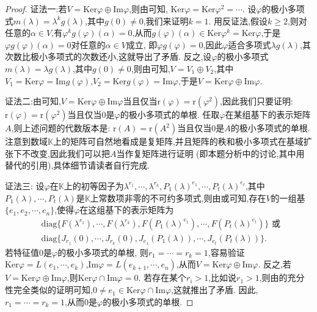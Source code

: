 \documentclass[../../main.tex]{subfiles}%
\begin{document}
\begin{proof}

{\color{blue}证法一:}若$V=\mathrm{Ker}\varphi\oplus\mathrm{Im}\varphi$,则由可知, $\mathrm{Ker}\varphi=\mathrm{Ker}\varphi^2=\cdots$. 设$\varphi$的极小多项式$m(\lambda)=\lambda^kg(\lambda)$,其中$g(0)\neq 0$,我们来证明$k = 1$. 用反证法,假设$k\geqslant 2$,则对任意的$\alpha\in V$,有$\varphi^kg(\varphi)(\alpha)=0$,从而$g(\varphi)(\alpha)\in\mathrm{Ker}\varphi^k=\mathrm{Ker}\varphi$,于是$\varphi g(\varphi)(\alpha)=0$对任意的$\alpha\in V$成立, 即$\varphi g(\varphi)=0$,因此$\varphi$适合多项式$\lambda g(\lambda)$,其次数比极小多项式的次数还小,这就导出了矛盾. 反之,设$\varphi$的极小多项式$m(\lambda)=\lambda g(\lambda)$,其中$g(0)\neq 0$,则由可知,$V = V_1\oplus V_2$,其中$V_1=\mathrm{Ker}\varphi=\mathrm{Im}g(\varphi)$,$V_2=\mathrm{Ker}g(\varphi)=\mathrm{Im}\varphi$,于是$V=\mathrm{Ker}\varphi\oplus\mathrm{Im}\varphi$.

{\color{blue}证法二:}由可知,$V=\mathrm{Ker}\varphi\oplus\mathrm{Im}\varphi$当且仅当$\mathrm{r}(\varphi)=\mathrm{r}(\varphi^2)$,因此我们只要证明: $\mathrm{r}(\varphi)=\mathrm{r}(\varphi^2)$当且仅当$0$是$\varphi$的极小多项式的单根. 任取$\varphi$在某组基下的表示矩阵$A$,则上述问题的代数版本是: $\mathrm{r}(A)=\mathrm{r}(A^2)$当且仅当$0$是$A$的极小多项式的单根. 注意到数域$\mathbb{K}$上的矩阵可自然地看成是复矩阵,并且矩阵的秩和极小多项式在基域扩张下不改变,因此我们可以把$A$当作复矩阵进行证明 (即本题分析中的讨论,其中用替代的引用),具体细节请读者自行完成.

{\color{blue}证法三:}
设$\varphi$在$\mathbb{K}$上的初等因子为$\lambda^{r_1},\cdots,\lambda^{r_k},P_1(\lambda)^{e_1},\cdots,P_t(\lambda)^{e_t}$,其中$P_1(\lambda),\cdots,P_t(\lambda)$是$\mathbb{K}$上常数项非零的不可约多项式,则由或可知,存在$V$的一组基$\{e_1,e_2,\cdots,e_n\}$,使得$\varphi$在这组基下的表示矩阵为
\begin{align*}
&\mathrm{diag}\{F(\lambda^{r_1}),\cdots,F(\lambda^{r_k}),F(P_1(\lambda)^{e_1}),\cdots,F(P_t(\lambda)^{e_t})\}\text{ 或 }\\
&\mathrm{diag}\{J_{r_1}(0),\cdots,J_{r_k}(0),J_{e_1}(P_1(\lambda)),\cdots,J_{e_t}(P_t(\lambda))\}.
\end{align*}
若特征值$0$是$\varphi$的极小多项式的单根, 则$r_1 = \cdots = r_k = 1$,容易验证$\mathrm{Ker}\varphi = L(e_1,\cdots,e_k)$,$\mathrm{Im}\varphi = L(e_{k + 1},\cdots,e_n)$,从而$V = \mathrm{Ker}\varphi\oplus\mathrm{Im}\varphi$. 反之,若$V = \mathrm{Ker}\varphi\oplus\mathrm{Im}\varphi$,则$\mathrm{Ker}\varphi\cap\mathrm{Im}\varphi = 0$. 若存在某个$r_i > 1$,比如说$r_1 > 1$,则由的充分性完全类似的证明可知,$0\neq e_1\in\mathrm{Ker}\varphi\cap\mathrm{Im}\varphi$,这就推出了矛盾. 因此,$r_1 = \cdots = r_k = 1$,从而$0$是$\varphi$的极小多项式的单根. 
\end{proof}
\end{document}
